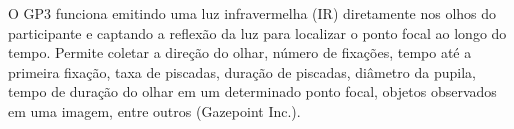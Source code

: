 O GP3 funciona emitindo uma luz infravermelha (IR) 
diretamente nos olhos do participante e captando a reflexão da luz para localizar o ponto focal ao longo do tempo. 
Permite coletar a direção do olhar, número de fixações, tempo até a primeira fixação, taxa de piscadas,
 duração de piscadas, diâmetro da pupila, tempo de duração do olhar em um determinado ponto focal, 
 objetos observados em uma imagem, entre outros (Gazepoint Inc.).

\subsection{}